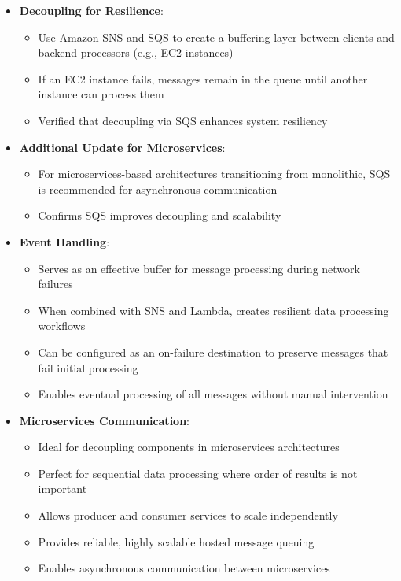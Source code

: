 \documentclass[11pt,a4paper]{report}
\begin{document}
\begin{itemize}
\begin{itemize}
  \item Prevents failed messages from blocking the processing of other messages
\end{itemize}
  \item \textbf{Decoupling for Resilience}:
\begin{itemize}
  \item Use Amazon SNS and SQS to create a buffering layer between clients and backend processors (e.g., EC2 instances)
  \item If an EC2 instance fails, messages remain in the queue until another instance can process them
  \item Verified that decoupling via SQS enhances system resiliency
\end{itemize}
  \item \textbf{Additional Update for Microservices}:
\begin{itemize}
  \item For microservices-based architectures transitioning from monolithic, SQS is recommended for asynchronous communication
  \item Confirms SQS improves decoupling and scalability
\end{itemize}
  \item \textbf{Event Handling}:
\begin{itemize}
  \item Serves as an effective buffer for message processing during network failures
  \item When combined with SNS and Lambda, creates resilient data processing workflows
  \item Can be configured as an on-failure destination to preserve messages that fail initial processing
  \item Enables eventual processing of all messages without manual intervention
\end{itemize}
  \item \textbf{Microservices Communication}:
\begin{itemize}
  \item Ideal for decoupling components in microservices architectures
  \item Perfect for sequential data processing where order of results is not important
  \item Allows producer and consumer services to scale independently
  \item Provides reliable, highly scalable hosted message queuing
  \item Enables asynchronous communication between microservices

\end{itemize}
\end{itemize}
\end{document}
